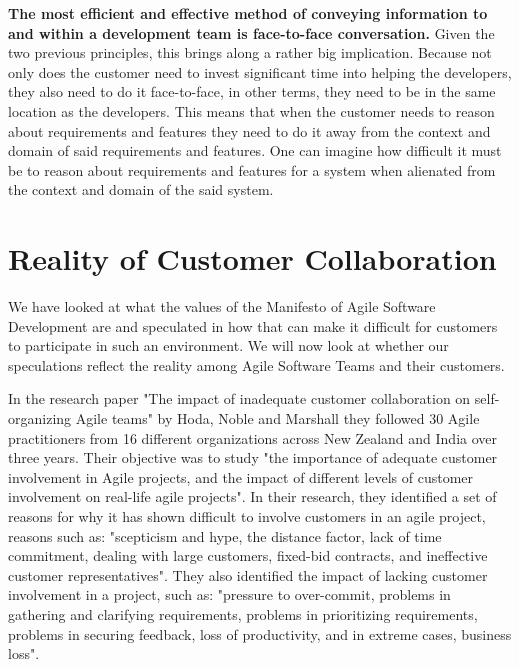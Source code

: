 \textbf{The most efficient and effective method of conveying information to and within a development team is face-to-face conversation.}
Given the two previous principles, this brings along a rather big implication.
Because not only does the customer need to invest significant time into helping the developers, they also need to do it face-to-face, in other terms, they need to be in the same location as the developers.
This means that when the customer needs to reason about requirements and features they need to do it away from the context and domain of said requirements and features.
One can imagine how difficult it must be to reason about requirements and features for a system when alienated from the context and domain of the said system. 

\section{Reality of Customer Collaboration}
We have looked at what the values of the Manifesto of Agile Software Development are and speculated in how that can make it difficult for customers to participate in such an environment.
We will now look at whether our speculations reflect the reality among Agile Software Teams and their customers.

In the research paper "The impact of inadequate customer collaboration on self-organizing Agile teams" by Hoda, Noble and Marshall \cite{Hoda2011TheIO} they followed 30 Agile practitioners from 16 different organizations across New Zealand and India over three years.
Their objective was to study "the importance of adequate customer involvement in Agile projects, and the impact of different levels of customer involvement on real-life agile projects".
In their research, they identified a set of reasons for why it has shown difficult to involve customers in an agile project, reasons such as: "scepticism and hype, the distance factor, lack of time commitment, dealing with large customers, fixed-bid contracts, and ineffective customer representatives".
They also identified the impact of lacking customer involvement in a project, such as: "pressure to over-commit, problems in gathering and clarifying requirements, problems in prioritizing requirements, problems in securing feedback, loss of productivity, and in extreme cases, business loss". \cite{Hoda2011TheIO}

